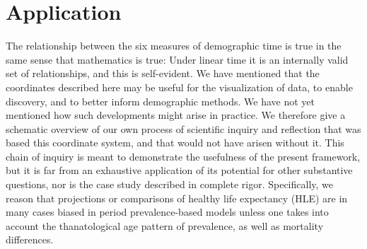 \documentclass[12pt,oneside,a4paper]{article} %
\begin{document}
%
%

\FloatBarrier

\section{Application}
The relationship between the six measures of demographic time is true in the
same sense that mathematics is true: Under linear time it is an internally valid
set of relationships, and this is self-evident. We have mentioned that the
coordinates described here may be useful for the visualization of data, to
enable discovery, and to better inform demographic methods. We have not yet
mentioned how such developments might arise in practice. We therefore give a
schematic overview of our own process of scientific inquiry and reflection that was based this coordinate system, and
that would not have arisen without it. This chain of inquiry is meant to demonstrate the
usefulness of the present framework, but it is far from an exhaustive
application of its potential for other substantive questions, nor is the case
study described in complete rigor. Specifically, we reason that
projections or comparisons of healthy life expectancy (HLE) are in many
cases biased in period prevalence-based models unless one takes into account the
thanatological age pattern of prevalence, as well as mortality differences.
\end{document}

